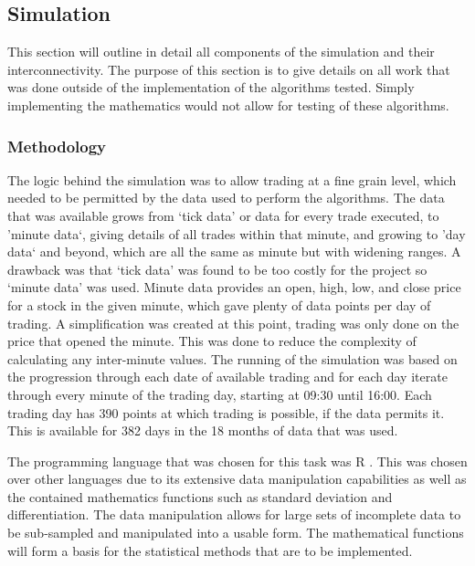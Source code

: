 \documentclass[conference]{IEEEtran}
\begin{document}

\subsection{Simulation}

This section will outline in detail all components of the simulation and their interconnectivity. The purpose of this section is to give details on all work that was done outside of the implementation of the algorithms tested. Simply implementing the mathematics would not allow for testing of these algorithms. 

\subsubsection{Methodology}

The logic behind the simulation was to allow trading at a fine grain level, which needed to be permitted by the data used to perform the algorithms. The data that was available grows from `tick data' or data for every trade executed, to 'minute data`, giving details of all trades within that minute, and growing to 'day data` and beyond, which are all the same as minute but with widening ranges. A drawback was that `tick data' was found to be too costly for the project so `minute data' was used. Minute data provides an open, high, low, and close price for a stock in the given minute, which gave plenty of data points per day of trading. A simplification was created at this point, trading was only done on the price that opened the minute. This was done to reduce the complexity of calculating any inter-minute values. The running of the simulation was based on the progression through each date of available trading and for each day iterate through every minute of the trading day, starting at 09:30 until 16:00. Each trading day has 390 points at which trading is possible, if the data permits it. This is available for 382 days in the 18 months of data that was used. 

The programming language that was chosen for this task was R \cite{Team2013}. This was chosen over other languages due to its extensive data manipulation capabilities as well as the contained mathematics functions such as standard deviation and differentiation. The data manipulation allows for large sets of incomplete data to be sub-sampled and manipulated into a usable form. The mathematical functions will form a basis for the statistical methods that are to be implemented.
\end{document}
